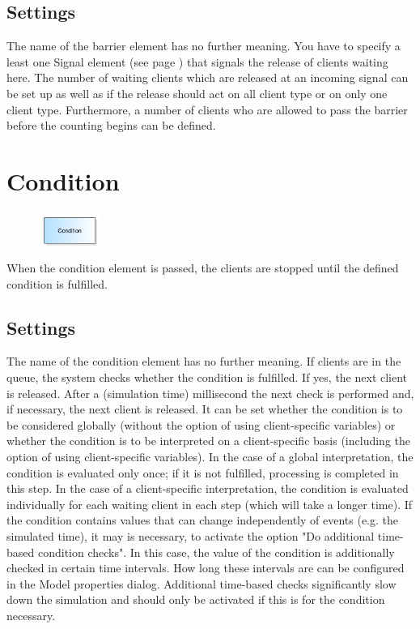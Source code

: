 \subsection*{Settings}

The name of the barrier element has no further meaning. You have to specify a least one
Signal element (see page \pageref{ref:ModelElementSignal}) that signals the release of clients waiting here.
The number of waiting clients which are released at an incoming signal can be set up as well as
if the release should act on all client type or on only one client type.
Furthermore, a number of clients who are allowed to pass the barrier before the counting begins
can be defined.


\section{Condition}
\label{ref:ModelElementHold}

\begin{figure}
\vspace{-22pt}
\includegraphics[width=2cm]{imageModelElementHold.png}
\vspace{-22pt}
\end{figure}

When the condition element is passed, the clients are stopped until the defined condition is fulfilled. 

\subsection*{Settings}

The name of the condition element has no further meaning.
If clients are in the queue, the system checks whether the condition is fulfilled.
If yes, the next client is released. After a (simulation time) millisecond the next check
is performed and, if necessary, the next client is released.
It can be set whether the condition is to be considered globally (without the option of using client-specific variables)
or whether the condition is to be interpreted on a client-specific basis (including the option of using client-specific variables).
In the case of a global interpretation, the condition is evaluated only once; if it is not fulfilled, processing is completed in this step.
In the case of a client-specific interpretation, the condition is evaluated individually for each waiting client in each step (which will take a longer time).
If the condition contains values that can change independently of events (e.g. the simulated time),
it may is necessary, to activate the option "Do additional time-based condition checks". In this case,
the value of the condition is additionally checked in certain time intervals. How long these intervals
are can be configured in the Model properties dialog.
Additional time-based checks significantly slow down the simulation and should only be activated
if this is for the condition necessary.


